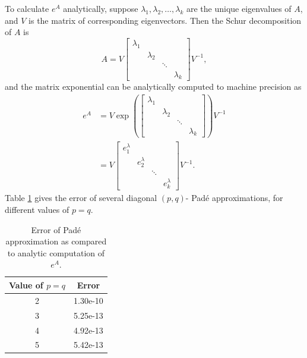 \documentclass{csri19}
\begin{document}
To calculate $e^A$ analytically, suppose $\lambda_1, \lambda_2, \dots, 
\lambda_k$ are the unique eigenvalues of $A$, and $V$ is the matrix of 
corresponding eigenvectors. Then the Schur decomposition of $A$ is 
\[A = V \begin{bmatrix} \lambda_1 &           &        &           \\
                                  & \lambda_2 &        &           \\
                                  &           & \ddots &           \\
                                  &           &        & \lambda_k \end{bmatrix}
 V^{-1},\] and the matrix exponential can be analytically computed to 
machine precision as
\begin{align*}
e^A &= V \exp\left(\begin{bmatrix} \lambda_1 &           &        &           \\
                                             & \lambda_2 &        &           \\
                                             &           & \ddots &           \\
                                             &           &        & \lambda_k \end{bmatrix}\right) V^{-1} \\
  &= V \begin{bmatrix} e^\lambda_1 &             &        &             \\
                                   & e^\lambda_2 &        &             \\
                                   &             & \ddots &             \\
                                   &             &        & e^\lambda_k \end{bmatrix} V^{-1}.
\end{align*}
Table \ref{CFK:tab:PadeError} gives the error of several diagonal $(p,q)$-
Pad\'e approximations, for different values of $p=q$.
\begin{table}[ht]
  \begin{center}
    \caption{Error of Pad\'e approximation as compared to analytic 
               computation of $e^A$.}
    \label{CFK:tab:PadeError}
    \begin{tabular}{|c|c|}
      \hline
      \textbf{Value of $p=q$} & \textbf{Error}\\
      \hline
      2 & 1.30e-10 \\
      3 & 5.25e-13 \\
      4 & 4.92e-13 \\
      5 & 5.42e-13 \\
      \hline
    \end{tabular}
  \end{center}
\end{table}
\end{document}
